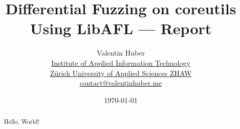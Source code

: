 \documentclass{article}
\title{%
\vspace{50px}%
    \Huge Differential Fuzzing on coreutils Using LibAFL\break%
    —\break%
    Report%
    \vspace{250px}%
}
\author{%
  Valentin Huber\vspace{5px}\\%
  \small \href{https://www.zhaw.ch/en/engineering/institutes-centres/init/}{Institute of Applied Information Technology}\\%
  \small \href{https://www.zhaw.ch/en}{Zürich University of Applied Sciences ZHAW}\\%
  \small \href{mailto://contact@valentinhuber.me}{contact@valentinhuber.me}%
  \vspace{10px}
}
\date{\today\vspace{5px}}
\begin{document}
\maketitle

\clearpage\newpage
\begin{center}
    \begin{minipage}{0.8\textwidth}
        \vspace{70px}
        \begin{abstract}
            Hello, %
            World!
        \end{abstract}
    \end{minipage}
\end{center}

\clearpage\newpage
{}
\tableofcontents
\clearpage\newpage
\restoregeometry
{}
\end{document}
